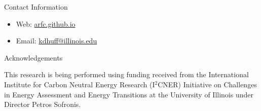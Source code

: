 \documentclass[final]{beamer}
\newlength{\onecolwid}
\newlength{\threecolwid}
\begin{document}
\begin{frame}[t]
\begin{columns}[t,totalwidth=\threecolwid]
\begin{column}{\onecolwid}
\begin{alertblock}{Contact Information}
\begin{itemize}
	\item Web: \href{arfc.github.io}{arfc.github.io}
	\item Email: \href{mailto:kdhuff@illinois.edu}{kdhuff@illinois.edu}
\end{itemize}

\end{alertblock}



\begin{block}{Acknowledgements}

This research is being performed using funding received
from the International Institute for Carbon Neutral Energy Research (I$^2$CNER) 
Initiative on Challenges in Energy Assessment and Energy Transitions at  the  
University of Illinois under Director Petros Sofronis.


\end{block}
\end{column}
\end{columns}
\end{frame}
\end{document}
